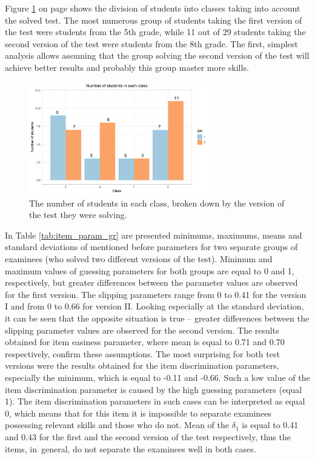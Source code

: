 \documentclass[english]{pwr_wmat_praca_dyplomowa}
\theoremstyle{plain}
\numberwithin{theorem}{chapter}
\theoremstyle{definition}
\numberwithin{theorem}{chapter}
\begin{document}
	Figure \ref{students_in_classes} on page \pageref{students_in_classes} shows the division of students into classes taking into account the solved test. The most numerous group of students taking the first version of the test were students from the 5th grade, while 11 out of 29 students taking the second version of the test were students from the 8th grade. The first, simplest analysis allows assuming that the group solving the second version of the test will achieve better results and probably this group master more skills.
	
	\begin{figure}[h!]
		\centering
		\includegraphics[width=0.7\textwidth]{Number_of_students.png}
		\caption{The number of students in each class, broken down by the version of the test they were solving.}
		\label{students_in_classes}
	\end{figure}
	
	In Table \ref{tab:item_param_gr} are presented minimums, maximums, means and standard deviations of mentioned before parameters for two separate groups of examinees (who solved two different versions of the test). Minimum and maximum values of guessing parameters for both groups are equal to 0 and 1, respectively, but greater differences between the parameter values are observed for the first version. The slipping parameters range from 0 to 0.41 for the version I and from 0 to 0.66 for version II. Looking especially at the standard deviation, it can be seen that the opposite situation is true -- greater differences between the slipping parameter values are observed for the second version. The results obtained for item easiness parameter, where mean is equal to 0.71 and 0.70 respectively, confirm these assumptions. The most surprising for both test versions were the results obtained for the item discrimination parameters, especially the minimum, which is equal to -0.11 and -0.66. Such a low value of the item discrimination parameter is caused by the high guessing parameters (equal 1). The item discrimination parameters in such cases can be interpreted as equal 0, which means that for this item it is impossible to separate examinees possessing relevant skills and those who do not. Mean of the $\delta_1$ is equal to 0.41 and 0.43 for the first and the second version of the test respectively, thus the items, in~general, do not separate the examinees well in both cases.
	
\end{document}
